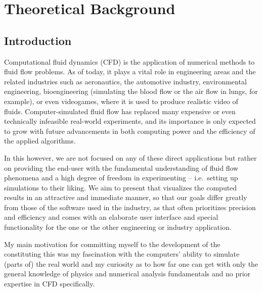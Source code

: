 \documentclass[11pt,a4paper,twoside,openright]{report}
\begin{document}


\setcounter{tocdepth}{2}
\tableofcontents

\newcommand{\dt}{\Delta t}

\chapter{Theoretical Background}
\pagestyle{fancy}

\section{Introduction}
Computational fluid dynamics (CFD) is the application of numerical methods to fluid flow problems. As of today, it plays a vital role in engineering areas and the related industries such as aeronautics, the automotive industry, environmental engineering, bioengineering (simulating the blood flow or the air flow in lungs, for example), or even videogames, where it is used to produce realistic video of fluids. Computer-simulated fluid flow has replaced many expensive or even technically infeasible real-world experiments, and its importance is only expected to grow with future advancements in both computing power and the efficiency of the applied algorithms.

In this \this{} however, we are not focused on any of these direct applications but rather on providing the end-user with the fundamental understanding of fluid flow phenomena and a high degree of freedom in experimenting -- i.e.\ setting up simulations to their liking. We aim to present \software{} that visualizes the computed results in an attractive and immediate manner, so that our goals differ greatly from those of the software used in the industry, as that often prioritizes precision and efficiency and comes with an elaborate user interface and special functionality for the one or the other engineering or industry application.

My main motivation for committing myself to the development of the \software{} constituting this \this{} was my fascination with the computers' ability to simulate (parts of) the real world and my curiosity as to how far one can get with only the general knowledge of physics and numerical analysis fundamentals and no prior expertise in CFD specifically.
\end{document}
